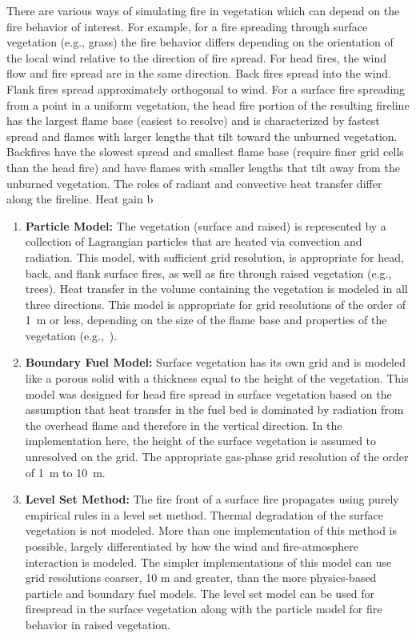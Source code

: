 \documentclass[journal,article,atmosphere,submit,moreauthors,pdftex]{Definitions/mdpi}
\begin{document}
There are various ways of simulating fire in vegetation which can depend on the fire behavior of interest. For example, for a fire spreading through surface vegetation (e.g., grass) the fire behavior differs depending on the orientation of the local wind relative to the direction of fire spread. For head fires, the wind flow and fire spread are in the same direction. Back fires spread into the wind. Flank fires spread approximately orthogonal to wind. For a surface fire spreading from a point in a uniform vegetation, the head fire portion of the resulting fireline has the largest flame base (easiest to resolve) and is characterized by fastest spread and flames with larger lengths that tilt toward the unburned vegetation. Backfires have the slowest spread and smallest flame base (require finer grid cells than the head fire) and have flames with smaller lengths that tilt away from the unburned vegetation. The roles of radiant and convective heat transfer differ along the fireline. Heat gain b
\begin{enumerate}
\item {\bf Particle Model:} The vegetation (surface and raised) is represented by a collection of Lagrangian particles that are heated via convection and radiation. This model, with sufficient grid resolution, is appropriate for head, back, and flank surface fires, as well as fire through raised vegetation (e.g., trees). Heat transfer in the volume containing the vegetation is modeled in all three directions. This model is appropriate for grid resolutions of the order of 1~m or less, depending on the size of the flame base and properties of the vegetation (e.g.,~\cite{Perez-Ramirez:FT2017}).
\item {\bf Boundary Fuel Model:} Surface vegetation has its own grid and is modeled like a porous solid with a thickness equal to the height of the vegetation. This model was designed for head fire spread in surface vegetation based on the assumption that heat transfer in the fuel bed is dominated by radiation from the overhead flame and therefore in the vertical direction.  In the implementation here, the height of the surface vegetation is assumed to unresolved on the grid. The appropriate gas-phase grid resolution of the order of 1~m to 10~m.
\item {\bf Level Set Method:} The fire front of a surface fire propagates using purely empirical rules in a level set method. Thermal degradation of the surface vegetation is not modeled. More than one implementation of this method is possible, largely differentiated by how the wind and fire-atmosphere interaction is modeled. The simpler implementations of this model can use grid resolutions coarser, 10 m and greater, than the more physics-based particle and boundary fuel models. The level set model can be used for firespread in the surface vegetation along with the particle model for fire behavior in raised vegetation. 
\end{enumerate}
\end{document}
